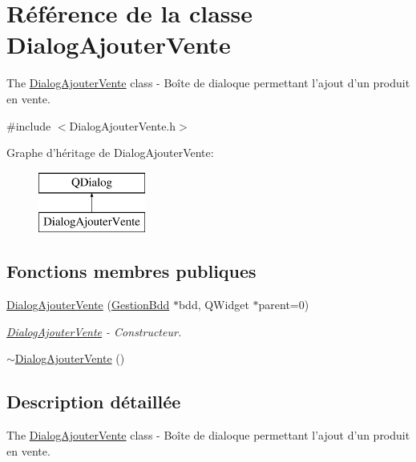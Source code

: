 \hypertarget{class_dialog_ajouter_vente}{\section{Référence de la classe Dialog\-Ajouter\-Vente}
\label{class_dialog_ajouter_vente}
}


The \hyperlink{class_dialog_ajouter_vente}{Dialog\-Ajouter\-Vente} class -\/ Boîte de dialoque permettant l'ajout d'un produit en vente.  




{\ttfamily \#include $<$Dialog\-Ajouter\-Vente.\-h$>$}

Graphe d'héritage de Dialog\-Ajouter\-Vente\-:\begin{figure}[H]
\begin{center}
\leavevmode
\includegraphics[height=2.000000cm]{class_dialog_ajouter_vente}
\end{center}
\end{figure}
\subsection*{Fonctions membres publiques}
\begin{DoxyCompactItemize}
\item 
\hyperlink{class_dialog_ajouter_vente_a891c176f7c824ede407e79dd31b3aafa}{Dialog\-Ajouter\-Vente} (\hyperlink{class_gestion_bdd}{Gestion\-Bdd} $\ast$bdd, Q\-Widget $\ast$parent=0)
\begin{DoxyCompactList}\small\item\em \hyperlink{class_dialog_ajouter_vente}{Dialog\-Ajouter\-Vente} -\/ Constructeur. \end{DoxyCompactList}\item 
\hyperlink{class_dialog_ajouter_vente_a92b237cd0f93ef53ee4f0f063075940b}{$\sim$\-Dialog\-Ajouter\-Vente} ()
\end{DoxyCompactItemize}


\subsection{Description détaillée}
The \hyperlink{class_dialog_ajouter_vente}{Dialog\-Ajouter\-Vente} class -\/ Boîte de dialoque permettant l'ajout d'un produit en vente. 

